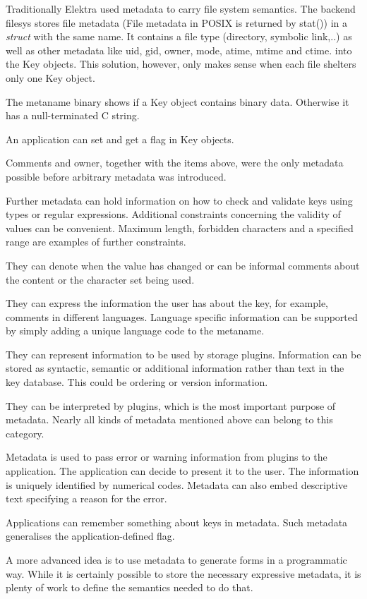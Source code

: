 \begin{DoxyItemize}
\item Traditionally Elektra used metadata to carry file system semantics. The backend {\ttfamily filesys} stores file metadata (File metadata in P\+O\+S\+I\+X is returned by {\ttfamily stat()}) in a {\itshape struct} with the same name. It contains a file type (directory, symbolic link,..) as well as other metadata like uid, gid, owner, mode, atime, mtime and ctime. into the {\ttfamily Key} objects. This solution, however, only makes sense when each file shelters only one {\ttfamily Key} object.
\item The metaname {\ttfamily binary} shows if a {\ttfamily Key} object contains binary data. Otherwise it has a null-\/terminated C string.
\item An application can set and get a flag in {\ttfamily Key} objects.
\item Comments and owner, together with the items above, were the only metadata possible before arbitrary metadata was introduced.
\item Further metadata can hold information on how to check and validate keys using types or regular expressions. Additional constraints concerning the validity of values can be convenient. Maximum length, forbidden characters and a specified range are examples of further constraints.
\item They can denote when the value has changed or can be informal comments about the content or the character set being used.
\item They can express the information the user has about the key, for example, comments in different languages. Language specific information can be supported by simply adding a unique language code to the metaname.
\item They can represent information to be used by storage plugins. Information can be stored as syntactic, semantic or additional information rather than text in the key database. This could be ordering or version information.
\item They can be interpreted by plugins, which is the most important purpose of metadata. Nearly all kinds of metadata mentioned above can belong to this category.
\item Metadata is used to pass error or warning information from plugins to the application. The application can decide to present it to the user. The information is uniquely identified by numerical codes. Metadata can also embed descriptive text specifying a reason for the error.
\item Applications can remember something about keys in metadata. Such metadata generalises the application-\/defined flag.
\item A more advanced idea is to use metadata to generate forms in a programmatic way. While it is certainly possible to store the necessary expressive metadata, it is plenty of work to define the semantics needed to do that.
\end{DoxyItemize}

